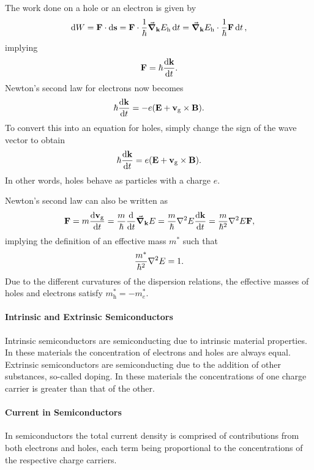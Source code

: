 The work done on a hole or an electron is given by
\begin{align*}
	\dd{W} = \vb{F}\cdot\dd{\vb{s}} = \vb{F}\cdot\frac{1}{\hbar}\grad_{\vb{k}}{E_{\text{h}}}\dd{t} = \grad_{\vb{k}}{E_{\text{h}}}\cdot\frac{1}{\hbar}\vb{F}\dd{t},
\end{align*}
implying
\begin{align*}
	\vb{F} = \hbar\dv{\vb{k}}{t}.
\end{align*}
Newton's second law for electrons now becomes
\begin{align*}
	\hbar\dv{\vb{k}}{t} = -e(\vb{E} + \vb{v}_{\text{g}}\times\vb{B}).
\end{align*}
To convert this into an equation for holes, simply change the sign of the wave vector to obtain
\begin{align*}
	\hbar\dv{\vb{k}}{t} = e(\vb{E} + \vb{v}_{\text{g}}\times\vb{B}).
\end{align*}
In other words, holes behave as particles with a charge $e$.

Newton's second law can also be written as
\begin{align*}
	\vb{F} = m\dv{\vb{v}_{\text{g}}}{t} = \frac{m}{\hbar}\dv{t}\grad_{\vb{k}}{E} = \frac{m}{\hbar}\laplacian{E}\dv{\vb{k}}{t} = \frac{m}{\hbar^{2}}\laplacian{E}\vb{F},
\end{align*}
implying the definition of an effective mass $m^{*}$ such that
\begin{align*}
	\frac{m^{*}}{\hbar^{2}}\laplacian{E} = 1.
\end{align*}
Due to the different curvatures of the dispersion relations, the effective masses of holes and electrons satisfy $m^{*}_{\text{h}} = -m^{*}_{e}$.

\paragraph{Intrinsic and Extrinsic Semiconductors}
Intrinsic semiconductors are semiconducting due to intrinsic material properties. In these materials the concentration of electrons and holes are always equal. Extrinsic semiconductors are semiconducting due to the addition of other substances, so-called doping. In these materials the concentrations of one charge carrier is greater than that of the other.

\paragraph{Current in Semiconductors}
In semiconductors the total current density is comprised of contributions from both electrons and holes, each term being proportional to the concentrations of the respective charge carriers.

